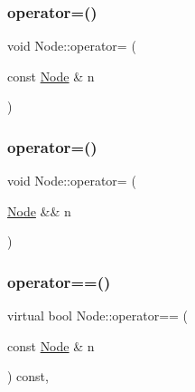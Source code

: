 \mbox{\label{class_node_addbfe90949f473c91203389f48095cf0}} 
\subsubsection{\texorpdfstring{operator=()}{operator=()}\hspace{0.1cm}{\footnotesize\ttfamily [1/2]}}
{\footnotesize\ttfamily void Node\+::operator= (\begin{DoxyParamCaption}\item[{const \hyperlink{class_node}{Node} \&}]{n }\end{DoxyParamCaption})\hspace{0.3cm}{\ttfamily [inline]}}

\mbox{\label{class_node_abcd5c8ca2ea54716a72f7e27f9a9c937}} 
\subsubsection{\texorpdfstring{operator=()}{operator=()}\hspace{0.1cm}{\footnotesize\ttfamily [2/2]}}
{\footnotesize\ttfamily void Node\+::operator= (\begin{DoxyParamCaption}\item[{\hyperlink{class_node}{Node} \&\&}]{n }\end{DoxyParamCaption})\hspace{0.3cm}{\ttfamily [inline]}}

\mbox{\label{class_node_a90aeee00ccda27f36bea9cdd774eae8d}} 
\subsubsection{\texorpdfstring{operator==()}{operator==()}}
{\footnotesize\ttfamily virtual bool Node\+::operator== (\begin{DoxyParamCaption}\item[{const \hyperlink{class_node}{Node} \&}]{n }\end{DoxyParamCaption}) const\hspace{0.3cm}{\ttfamily [inline]}, {\ttfamily [virtual]}}

